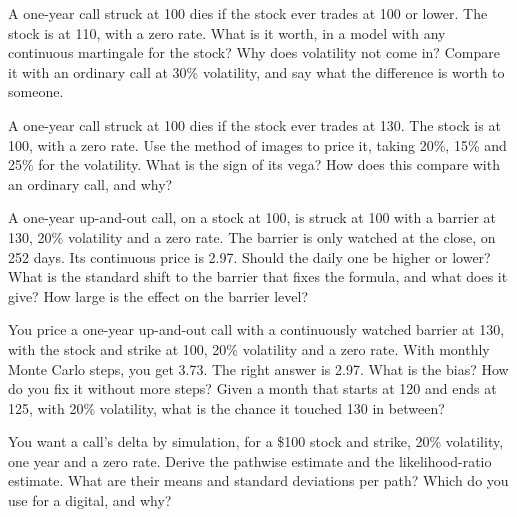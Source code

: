 \begin{question}\label{iq:iv2:pricing-and-numerics:36}
A one-year call struck at 100 dies if the stock ever trades at 100 or lower. The stock is at 110, with a zero rate. What is it worth, in a model with any continuous martingale for the stock? Why does volatility not come in? Compare it with an ordinary call at 30\% volatility, and say what the difference is worth to someone.
\end{question}

\begin{question}\label{iq:iv2:pricing-and-numerics:37}
A one-year call struck at 100 dies if the stock ever trades at 130. The stock is at 100, with a zero rate. Use the method of images to price it, taking 20\%, 15\% and 25\% for the volatility. What is the sign of its vega? How does this compare with an ordinary call, and why?
\end{question}

\begin{question}\label{iq:iv2:pricing-and-numerics:38}
A one-year up-and-out call, on a stock at 100, is struck at 100 with a barrier at 130, 20\% volatility and a zero rate. The barrier is only watched at the close, on 252 days. Its continuous price is 2.97. Should the daily one be higher or lower? What is the standard shift to the barrier that fixes the formula, and what does it give? How large is the effect on the barrier level?
\end{question}

\begin{question}\label{iq:iv2:pricing-and-numerics:39}
You price a one-year up-and-out call with a continuously watched barrier at 130, with the stock and strike at 100, 20\% volatility and a zero rate. With monthly Monte Carlo steps, you get 3.73. The right answer is 2.97. What is the bias? How do you fix it without more steps? Given a month that starts at 120 and ends at 125, with 20\% volatility, what is the chance it touched 130 in between?
\end{question}

\begin{question}\label{iq:iv2:pricing-and-numerics:40}
You want a call's delta by simulation, for a \$100 stock and strike, 20\% volatility, one year and a zero rate. Derive the pathwise estimate and the likelihood-ratio estimate. What are their means and standard deviations per path? Which do you use for a digital, and why?
\end{question}

